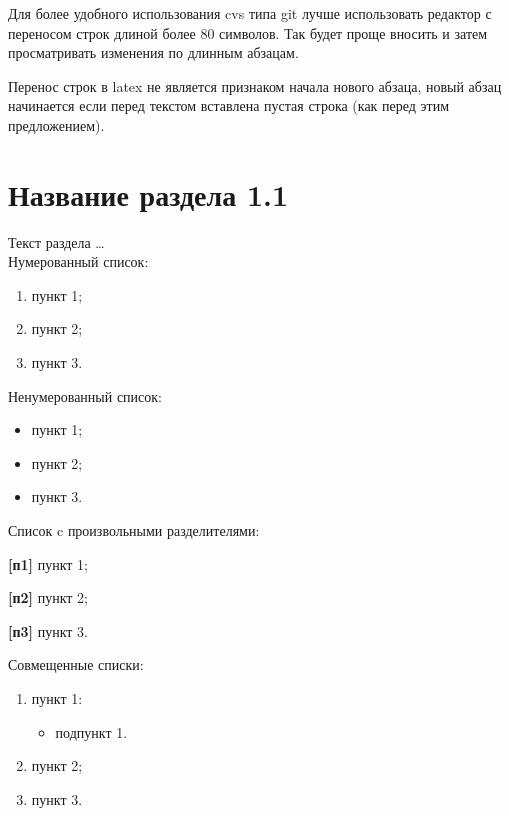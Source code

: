 
\begin{singlespace}
   \label{chapt1}
\end{singlespace}

Для более удобного использования cvs типа git лучше использовать
редактор с переносом строк длиной более 80 символов. Так будет проще
вносить и затем просматривать изменения по длинным абзацам.

Перенос строк в latex не является признаком начала нового абзаца,
новый абзац начинается если перед текстом вставлена пустая строка (как
перед этим предложением). \\

\section{Название раздела 1.1} \label{sect1_1}

Текст раздела \dots{} \\

Нумерованный список:
\begin{enumerate}
\item пункт 1;
\item пункт 2;
\item пункт 3. \\
\end{enumerate}

Ненумерованный список:
\begin{itemize}
\item пункт 1;
\item пункт 2;
\item пункт 3. \\
\end{itemize}

Список c произвольными разделителями:
\begin{description}
\item{\textbf{[п1]}} пункт 1;
\item{\textbf{[п2]}} пункт 2;
\item{\textbf{[п3]}} пункт 3. \\
\end{description}

Совмещенные списки:
\begin{enumerate}
\item пункт 1:
      \begin{itemize}
      \item подпункт 1.
      \end{itemize}
\item пункт 2;
\item пункт 3. \\
\end{enumerate}

